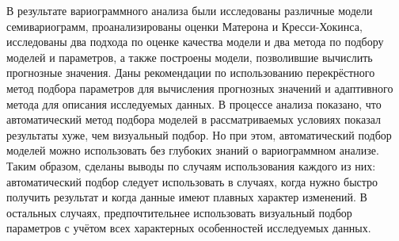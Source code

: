 В результате вариограммного анализа были исследованы различные модели семивариограмм, проанализированы оценки Матерона и Кресси-Хокинса, исследованы два подхода по оценке качества модели и два метода по подбору моделей и параметров, а также построены модели, позволившие вычислить прогнозные значения. Даны рекомендации по использованию перекрёстного метод подбора параметров для вычисления прогнозных значений и адаптивного метода для описания исследуемых данных. В процессе анализа показано, что автоматический метод подбора моделей в рассматриваемых условиях показал результаты хуже, чем визуальный подбор. Но при этом, автоматический подбор моделей можно использовать без глубоких знаний о вариограммном анализе. Таким образом, сделаны выводы по случаям использования каждого из них: автоматический подбор следует использовать в случаях, когда нужно быстро получить результат и когда данные имеют плавных характер изменений. В остальных случаях, предпочтительнее использовать визуальный подбор параметров с учётом всех характерных особенностей исследуемых данных.